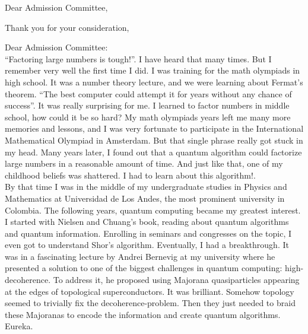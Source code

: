 \documentclass[11pt,a4paper,sans]{moderncv}        %
\begin{document}
\date{December 01, 2018}
\opening{Dear Admission Committee,}
\closing{Thank you for your consideration,}


\justify
Dear Admission Committee:\\

\noindent “Factoring large numbers is tough!”. I have heard that many times. But I remember very well the first time I did. I was training for the math olympiads in high school. It was a number theory lecture, and we were learning about Fermat’s theorem.  “The best computer could attempt it for years without any chance of success”. It was really surprising for me. I learned to factor numbers in middle school, how could it be so hard? My math olympiads years left me many more memories and lessons, and I was very fortunate to participate in the International Mathematical Olympiad in Amsterdam. But that single phrase really got stuck in my head. Many years later, I found out that a quantum algorithm could factorize large numbers in a reasonable amount of time. And just like that, one of my childhood beliefs was shattered. I had to learn about this algorithm!. \\

By that time I was in the middle of my undergraduate studies in Physics and Mathematics at Universidad de Los Andes, the most prominent university in Colombia. The following years, quantum computing became my greatest interest. I started with Nielsen and Chuang’s book, reading about quantum algorithms and quantum information. Enrolling in seminars and congresses on the topic, I even got to understand Shor’s algorithm. Eventually, I had a breakthrough. It was in a fascinating lecture by Andrei Bernevig at my university where he presented a solution to one of the biggest challenges in quantum computing: high-decoherence. To address it, he proposed using Majorana quasiparticles appearing at the edges of topological superconductors. It was brilliant. Somehow topology seemed to trivially fix the decoherence-problem. Then they just needed to braid these Majoranas to encode the information and create quantum algorithms. Eureka. \\
\end{document}
